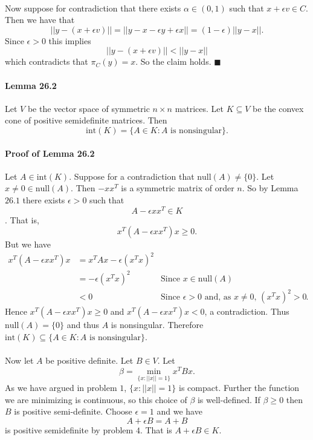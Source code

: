 \documentclass[letterpaper,12pt,oneside,onecolumn]{article}
\begin{document}
\paragraph{}
Now suppose for contradiction that there exists $\alpha \in (0,1)$ such that $x + \epsilon v \in C$. Then we have that
$$ ||y - (x + \epsilon v)|| = ||y - x - \epsilon y + \epsilon x|| = (1-\epsilon) ||y-x||.$$
Since $\epsilon > 0$ this implies
$$||y - (x + \epsilon v)|| < ||y -x|| $$
which contradicts that $\pi_C(y) = x$. So the claim holds. $\blacksquare$
\paragraph{Lemma 26.2}
Let $V$ be the vector space of symmetric $n\times n$ matrices. Let $K\subseteq V$ be the convex cone of positive semidefinite matrices. Then $$\text{int}(K) =\{A \in K : A\text{ is nonsingular}\}.$$
\paragraph{Proof of Lemma 26.2}
Let $A \in \text{int}(K)$. Suppose for a contradiction that $\text{null}(A) \neq \{0\}$. Let $x \neq 0 \in \text{null}(A)$. Then $-xx^T$ is a symmetric matrix of order $n$. So by Lemma $26.1$ there exists $\epsilon > 0$ such that $$A - \epsilon xx^T \in K$$. That is,
$$x^T(A - \epsilon xx^T)x \geq 0.$$
But we have
\begin{align*}
x^T(A - \epsilon xx^T)x &= x^TAx - \epsilon (x^Tx)^2  \\
&= -\epsilon (x^Tx)^2  &\text{Since $x\in\text{null}(A)$} \\
&< 0 &\text{Since $\epsilon > 0$ and, as $x \neq 0$, $(x^Tx)^2 > 0$}. 
\end{align*}
Hence $x^T(A - \epsilon xx^T)x \geq 0$ and $x^T(A - \epsilon xx^T)x  < 0$, a contradiction. Thus $\text{null}(A) = \{0\}$ and thus $A$ is nonsingular. Therefore $\text{int}(K) \subseteq \{A \in K : A \text{ is nonsingular}\}$.
\paragraph{}
Now let $A$ be positive definite. Let $B \in V$. Let
$$ \beta = \min_{\{x : ||x|| = 1\}} x^T B x.$$
As we have argued in problem $1$, $\{x : ||x||=1\}$ is compact. Further the function we are minimizing is continuous, so this choice of $\beta$ is well-defined. If $\beta \geq 0$ then $B$ is positive semi-definite. Choose $\epsilon = 1$ and we have
$$A + \epsilon B = A + B$$
is positive semidefinite by problem $4$. That is $A +\epsilon B \in K$.
\end{document}
